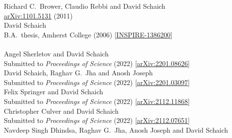 \begin{spacelist}
\begin{revnumerate}
      Richard C.~Brower, Claudio Rebbi and David Schaich \\
      \href{http://arxiv.org/abs/1101.5131}{arXiv:1101.5131} (2011)
    \pagebreakitem
       \\
      David Schaich \\
      B.A.\ thesis, Amherst College (2006) [\href{http://inspirehep.net/record/1386200}{INSPIRE-1386200}] \\
%
%
%
\vspace{18 pt} \hspace{-22 pt}{\large \bfseries Conference proceedings} \vspace{-8 pt}
    \pagebreakitem
       \\
      Angel Sherletov and David Schaich \\
      Submitted to \textit{Proceedings of Science} (2022) [\href{http://arxiv.org/abs/2201.08626}{arXiv:2201.08626}]
    \pagebreakitem
       \\
      David Schaich, Raghav G.~Jha and Anosh Joseph \\
      Submitted to \textit{Proceedings of Science} (2022) [\href{http://arxiv.org/abs/2201.03097}{arXiv:2201.03097}]
    \pagebreakitem
       \\
      Felix Springer and David Schaich \\
      Submitted to \textit{Proceedings of Science} (2022) [\href{http://arxiv.org/abs/2112.11868}{arXiv:2112.11868}]
    \pagebreakitem
       \\
      Christopher Culver and David Schaich \\
      Submitted to \textit{Proceedings of Science} (2022) [\href{http://arxiv.org/abs/2112.07651}{arXiv:2112.07651}]
    \pagebreakitem
       \\
      Navdeep Singh Dhindsa, Raghav G.~Jha, Anosh Joseph and David Schaich \\

\end{revnumerate}
\end{spacelist}
